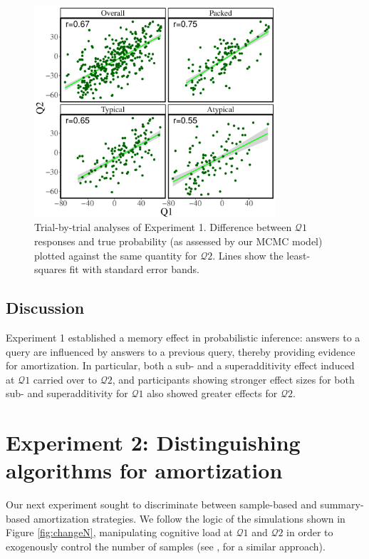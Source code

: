 \begin{figure}
\centering
\includegraphics[width=0.8\textwidth]{figures/exp1correspondence.pdf}
\caption{Trial-by-trial analyses of Experiment 1. Difference between $\mathcal{Q}1$ responses and true probability (as assessed by our MCMC model) plotted against the same quantity for $\mathcal{Q}2$. Lines show the least-squares fit with standard error bands.}
\label{fig:correspondence1}
\end{figure}

\subsection{Discussion}

Experiment 1 established a memory effect in probabilistic inference: answers to a query are influenced by answers to a previous query, thereby providing evidence for amortization. In particular, both a sub- and a superadditivity effect induced at $\mathcal{Q}1$ carried over to $\mathcal{Q}2$, and participants showing stronger effect sizes for both sub- and superadditivity for $\mathcal{Q}1$ also showed greater effects for $\mathcal{Q}2$. 

\section{Experiment 2: Distinguishing algorithms for amortization}

Our next experiment sought to discriminate between sample-based and summary-based amortization strategies. We follow the logic of the simulations shown in Figure \ref{fig:changeN}, manipulating cognitive load at $\mathcal{Q}1$ and $\mathcal{Q}2$ in order to exogenously control the number of samples (see \citet{thaker2017online,dasgupta2017hypotheses}, for a similar approach). 

